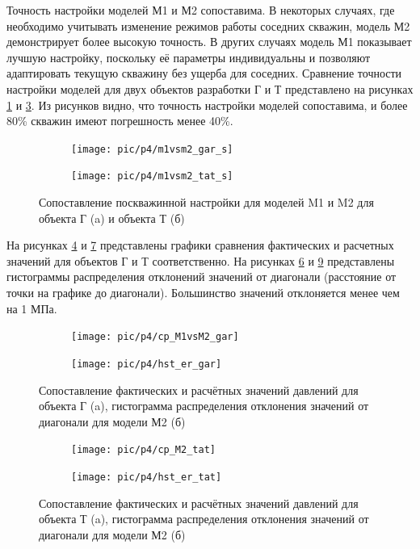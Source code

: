 \documentclass[14pt]{article}
\begin{document}
Точность настройки моделей М1 и М2 сопоставима. В некоторых случаях, где необходимо учитывать изменение режимов работы соседних скважин, модель М2 демонстрирует более высокую точность. В других случаях модель М1 показывает лучшую настройку, поскольку её параметры индивидуальны и позволяют адаптировать текущую скважину без ущерба для соседних.
Сравнение точности настройки моделей для двух объектов разработки Г и Т представлено на рисунках \ref{fig:m1vsm2_gar} и \ref{fig:m1vsm2_tat}. Из рисунков видно, что точность настройки моделей сопоставима, и более 80\% скважин имеют погрешность менее 40\%. 
\begin{figure}[!htb]
	\begin{subfigure}[b]{0.45\linewidth}
		\centering
		\texttt{[image: pic/p4/m1vsm2\_gar\_s]}
		\caption{}
		\label{fig:m1vsm2_gar}
	\end{subfigure}
	\begin{subfigure}[b]{0.45\linewidth}
		\centering
		\texttt{[image: pic/p4/m1vsm2\_tat\_s]}
		\caption{}
		\label{fig:m1vsm2_tat}
	\end{subfigure}
	\caption{Сопоставление поскважинной настройки для моделей M1 и M2 для объекта Г (a) и объекта Т (б)}
\end{figure}
На рисунках \ref{fig:сp_m1vsm2_gar} и \ref{fig:сp_m1vsm2_tat} представлены графики сравнения фактических и расчетных значений для объектов Г и Т соответственно. На рисунках \ref{fig:hst_er_gar} и \ref{fig:hst_er_tat} представлены гистограммы распределения отклонений значений от диагонали (расстояние от точки на графике до диагонали). Большинство значений отклоняется менее чем на 1 МПа.
\begin{figure}[!htb]
	\begin{subfigure}[b]{0.5\linewidth}
		\centering
		\texttt{[image: pic/p4/cp\_M1vsM2\_gar]}
		\caption{}
		\label{fig:сp_m1vsm2_gar}
	\end{subfigure}
	\begin{subfigure}[b]{0.5\linewidth}
		\texttt{[image: pic/p4/hst\_er\_gar]}
		\caption{}
		\label{fig:hst_er_gar}
	\end{subfigure}
	\caption{Сопоставление фактических и расчётных значений давлений для объекта Г (a), гистограмма распределения отклонения значений от диагонали для модели М2 (б)}
\end{figure}
\begin{figure}[!htb]
	\begin{subfigure}[b]{0.5\linewidth}
		\texttt{[image: pic/p4/cp\_M2\_tat]}
		\caption{}
		\label{fig:сp_m1vsm2_tat}
	\end{subfigure}
	\begin{subfigure}[b]{0.5\linewidth}
		\texttt{[image: pic/p4/hst\_er\_tat]}
		\caption{}
		\label{fig:hst_er_tat}
	\end{subfigure}
	\caption{Сопоставление фактических и расчётных значений давлений для объекта Т (a), гистограмма распределения отклонения значений от диагонали для модели М2 (б)}
\end{figure}
\end{document}
